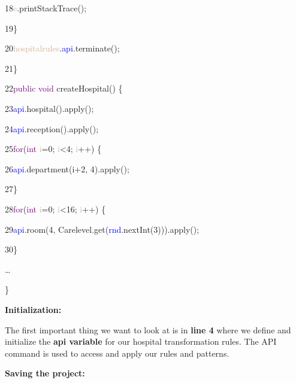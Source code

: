 {18\hspace{1.5cm}\textcolor{Tan}{e}.printStackTrace();

19\hspace{1cm}\}

20\hspace{1cm}\textcolor{Tan}{hospitalrules}.\textcolor{blue}{api}.terminate();

21\hspace{0.5cm}\}

22\hspace{0.5cm}\textcolor{Purple}{public void} createHospital() \{

23\hspace{1cm}\textcolor{blue}{api}.hospital().apply();

24\hspace{1cm}\textcolor{blue}{api}.reception().apply();

25\hspace{1cm}\textcolor{Purple}{for}(\textcolor{Purple}{int} \textcolor{Tan}{i}=0; \textcolor{Tan}{i}<4; \textcolor{Tan}{i}++) \{

26\hspace{1.5cm}\textcolor{blue}{api}.department(i+2, 4).apply();

27\hspace{1cm}\}

28\hspace{1cm}\textcolor{Purple}{for}(\textcolor{Purple}{int} \textcolor{Tan}{i}=0; \textcolor{Tan}{i}<16; \textcolor{Tan}{i}++) \{

29\hspace{1.5cm}\textcolor{blue}{api}.room(4, Carelevel.get(\textcolor{blue}{rnd}.nextInt(3))).apply();

30\hspace{1cm}\} 

\hspace{0.7cm}…

\hspace{0.7cm}\}

}

\clearpage

\textbf{Initialization:}

The first important thing we want to look at is in \textbf{line 4} where we define and initialize the \textbf{api variable} for our hospital transformation rules.\newline
The API command is used to access and apply our rules and patterns.\newline

\textbf{Saving the project:}

